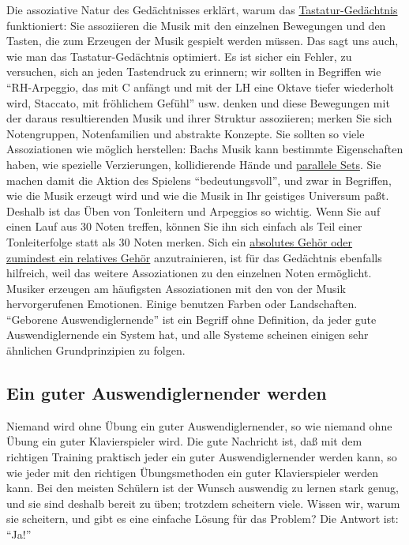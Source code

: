 Die assoziative Natur des Gedächtnisses erklärt, warum das \hyperref[c1iii6tastatur]{Tastatur-Gedächtnis} funktioniert: Sie assoziieren die Musik mit den einzelnen Bewegungen und den Tasten, die zum Erzeugen der Musik gespielt werden müssen.
Das sagt uns auch, wie man das Tastatur-Gedächtnis optimiert.
Es ist sicher ein Fehler, zu versuchen, sich an jeden Tastendruck zu erinnern; wir sollten in Begriffen wie \enquote{RH-Arpeggio, das mit C anfängt und mit der LH eine Oktave tiefer wiederholt wird, Staccato, mit fröhlichem Gefühl} usw. denken und diese Bewegungen mit der daraus resultierenden Musik und ihrer Struktur assoziieren; merken Sie sich Notengruppen, Notenfamilien und abstrakte Konzepte.
Sie sollten so viele Assoziationen wie möglich herstellen: Bachs Musik kann bestimmte Eigenschaften haben, wie spezielle Verzierungen, kollidierende Hände und \hyperref[c1ii11]{parallele Sets}.
Sie machen damit die Aktion des Spielens \enquote{bedeutungsvoll}, und zwar in Begriffen, wie die Musik erzeugt wird und wie die Musik in Ihr geistiges Universum paßt.
Deshalb ist das Üben von Tonleitern und Arpeggios so wichtig.
Wenn Sie auf einen Lauf aus 30 Noten treffen, können Sie ihn sich einfach als Teil einer Tonleiterfolge statt als 30 Noten merken.
Sich ein \hyperref[c1iii12]{absolutes Gehör oder zumindest ein relatives Gehör} anzutrainieren, ist für das Gedächtnis ebenfalls hilfreich, weil das weitere Assoziationen zu den einzelnen Noten ermöglicht.
Musiker erzeugen am häufigsten Assoziationen mit den von der Musik hervorgerufenen Emotionen.
Einige benutzen Farben oder Landschaften.
\enquote{Geborene Auswendiglernende} ist ein Begriff ohne Definition, da jeder gute Auswendiglernende ein System hat, und alle Systeme scheinen einigen sehr ähnlichen Grundprinzipien zu folgen.


\subsection{Ein guter Auswendiglernender werden}
\label{c1iii6n}

Niemand wird ohne Übung ein guter Auswendiglernender, so wie niemand ohne Übung ein guter Klavierspieler wird.
Die gute Nachricht ist, daß mit dem richtigen Training praktisch jeder ein guter Auswendiglernender werden kann, so wie jeder mit den richtigen Übungsmethoden ein guter Klavierspieler werden kann.
Bei den meisten Schülern ist der Wunsch auswendig zu lernen stark genug, und sie sind deshalb bereit zu üben; trotzdem scheitern viele.
Wissen wir, warum sie scheitern, und gibt es eine einfache Lösung für das Problem?
Die Antwort ist: \enquote{Ja!}

